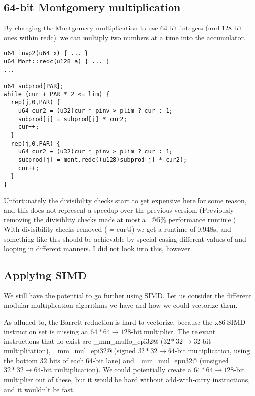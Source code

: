 \subsection{64-bit Montgomery multiplication}

By changing the Montgomery multiplication to use 64-bit integers (and 128-bit ones within redc),
we can multiply two numbers at a time into the accumulator.

\begin{lstlisting}
u64 invp2(u64 x) { ... }
u64 Mont::redc(u128 a) { ... }
...

u64 subprod[PAR];
while (cur + PAR * 2 <= lim) {
  rep(j,0,PAR) {
    u64 cur2 = (u32)cur * pinv > plim ? cur : 1;
    subprod[j] = subprod[j] * cur2;
    cur++;
  }
  rep(j,0,PAR) {
    u64 cur2 = (u32)cur * pinv > plim ? cur : 1;
    subprod[j] = mont.redc((u128)subprod[j] * cur2);
    cur++;
  }
}
\end{lstlisting}

Unfortunately the divisibility checks start to get expensive here for some reason, and this does not represent a speedup over the previous version.
(Previously removing the divisiblity checks made at most a \verb@~@5\% performance runtime.)
With divisibility checks removed ( = cur@) we get a runtime of 0.948s, and something like this should be achievable
by special-casing different values of \verb@p@ and looping in different manners.
I did not look into this, however.

\subsection{Applying SIMD}

We still have the potential to go further using SIMD.
Let us consider the different modular multiplication algorithms we have and how we could vectorize them.

As alluded to, the Barrett reduction is hard to vectorize, because the x86 SIMD instruction set is missing an \mbox{$64*64\rightarrow128$}-bit multiplier.
The relevant instructions that do exist are \verb@_mm_mullo_epi32@ (\mbox{$32*32\rightarrow32$}-bit multiplication), \verb@_mm_mul_epi32@ (signed \mbox{$32*32\rightarrow64$}-bit multiplication, using the bottom $32$ bits of each 64-bit lane) and \verb@_mm_mul_epu32@ (unsigned \mbox{$32*32\rightarrow64$}-bit multiplication).
We could potentially create a \mbox{$64*64\rightarrow128$}-bit multiplier out of these, but it would be hard without add-with-carry instructions, and it wouldn't be fast.

